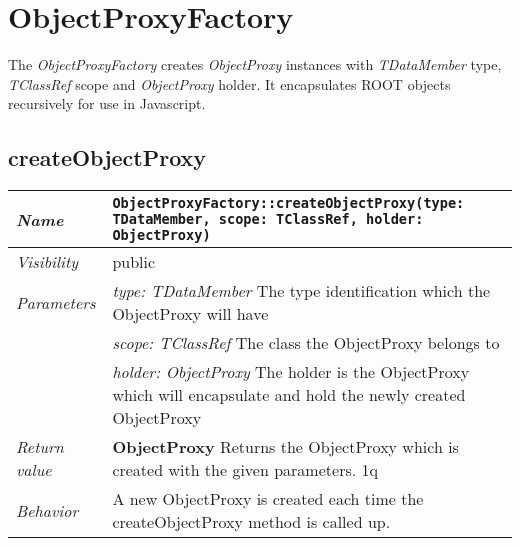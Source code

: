 \chapter{ObjectProxyFactory}
The \textit{ObjectProxyFactory} creates \textit{ObjectProxy} instances with \textit{TDataMember} type, \textit{TClassRef} scope and \textit{ObjectProxy} holder. It encapsulates ROOT objects recursively for use in Javascript. 
\section{createObjectProxy}
\begin{longtable}{p{3cm} @{\hskip 1cm} p{12cm}}
 \hline
\textit{Name} & \texttt{ObjectProxyFactory::createObjectProxy(type: TDataMember, scope: TClassRef, holder: ObjectProxy)}\\
\hline
 \textit{Visibility} & public\\
\hline
\textit{Parameters} & \textit{type: TDataMember} The type identification which the ObjectProxy will have \\
& \textit{scope: TClassRef} The class the ObjectProxy belongs to \\
& \textit{holder: ObjectProxy}  The holder is the ObjectProxy which will encapsulate and hold the newly created ObjectProxy \\
\hline
\textit{Return value} & \textbf{ObjectProxy} Returns the ObjectProxy which is created with the given parameters. 1q\\
  \hline
 \textit{Behavior} & A new ObjectProxy is created each time the createObjectProxy method is called up. \\
\hline
\end{longtable} \pagebreak
 
